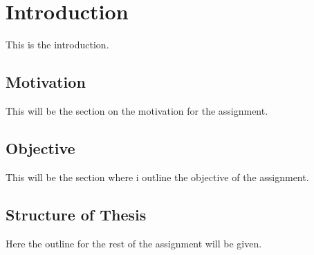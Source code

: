 \chapter{Introduction} \label{chap:intro}

This is the introduction. \bigskip

\section{Motivation}

This will be the section on the motivation for the assignment.

\section{Objective}

This will be the section where i outline the objective of the assignment.

\section{Structure of Thesis}

Here the outline for the rest of the assignment will be given.
